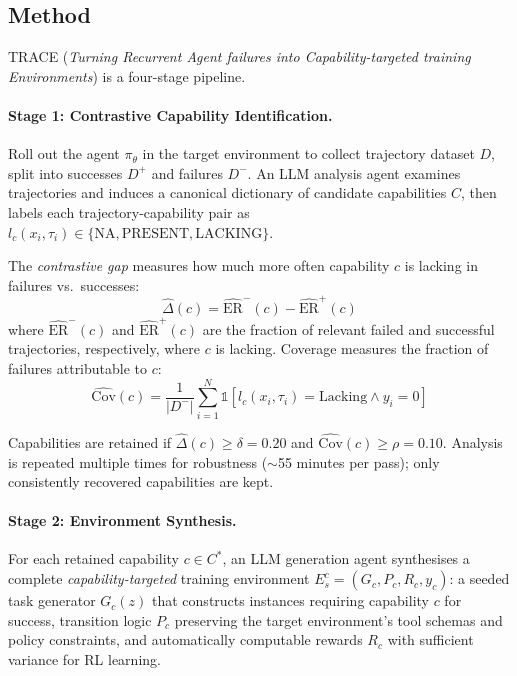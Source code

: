 \documentclass[11pt]{article}
\begin{document}
\subsection{Method}

TRACE (\textit{Turning Recurrent Agent failures into Capability-targeted training Environments}) is a four-stage pipeline.

\paragraph{Stage 1: Contrastive Capability Identification.}
Roll out the agent $\pi_\theta$ in the target environment to collect trajectory dataset $D$, split into successes $D^{+}$ and failures $D^{-}$. An LLM analysis agent examines trajectories and induces a canonical dictionary of candidate capabilities $C$, then labels each trajectory-capability pair as $l_c(x_i, \tau_i) \in \{\mathrm{NA}, \mathrm{PRESENT}, \mathrm{LACKING}\}$.

The \textit{contrastive gap} measures how much more often capability $c$ is lacking in failures vs.\ successes:
\begin{equation}
    \hat{\Delta}(c) = \widehat{\mathrm{ER}}^{-}(c) - \widehat{\mathrm{ER}}^{+}(c)
\end{equation}
where $\widehat{\mathrm{ER}}^{-}(c)$ and $\widehat{\mathrm{ER}}^{+}(c)$ are the fraction of relevant failed and successful trajectories, respectively, where $c$ is lacking. Coverage measures the fraction of failures attributable to $c$:
\begin{equation}
    \widehat{\mathrm{Cov}}(c) = \frac{1}{|D^{-}|} \sum_{i=1}^{N} \mathbb{1}[l_c(x_i, \tau_i) = \mathrm{Lacking} \wedge y_i = 0]
\end{equation}

Capabilities are retained if $\hat{\Delta}(c) \geq \delta = 0.20$ and $\widehat{\mathrm{Cov}}(c) \geq \rho = 0.10$. Analysis is repeated multiple times for robustness ($\sim$55 minutes per pass); only consistently recovered capabilities are kept.

\paragraph{Stage 2: Environment Synthesis.}
For each retained capability $c \in C^{*}$, an LLM generation agent synthesises a complete \textit{capability-targeted} training environment $E_{s}^{c} = (G_c, P_c, R_c, y_c)$: a seeded task generator $G_c(z)$ that constructs instances requiring capability $c$ for success, transition logic $P_c$ preserving the target environment's tool schemas and policy constraints, and automatically computable rewards $R_c$ with sufficient variance for RL learning.
\end{document}
